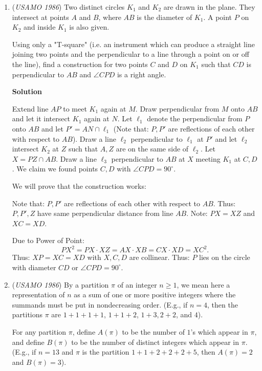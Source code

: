 \begin{enumerate}
 In summary, the smallest value of $n$ greater than 1 for which $I_n$ is an integer is $\boxed{337}$.

 


	\item (\textit{USAMO 1986}) Two distinct circles $K_1$ and $K_2$ are drawn in the plane. They intersect at points $A$ and $B$, where $AB$ is the diameter of $K_1$. A point $P$ on $K_2$ and inside $K_1$ is also given.


 Using only a "T-square" (i.e. an instrument which can produce a straight line joining two points and the perpendicular to a line through a point on or off the line), find a construction for two points $C$ and $D$ on $K_1$ such that $CD$ is perpendicular to $AB$ and $\angle CPD$ is a right angle.


 



\textbf{Solution}

Extend line $AP$ to meet $K_1$ again at $M$. Draw perpendicular from $M$ onto $AB$ and let it intersect $K_1$ again at $N$. Let $\ell_1$ denote the perpendicular from $P$ onto $AB$ and let $P'=AN \cap \ell_1$ (Note that: $P, P'$ are reflections of each other with respect to $AB$). Draw a line $\ell_2$ perpendicular to $\ell_1$ at $P'$ and let $\ell_2$ intersect $K_2$ at $Z$ such that $A, Z$ are on the same side of $\ell_2$. Let $X = PZ \cap AB$. Draw a line $\ell_3$ perpendicular to $AB$ at $X$ meeting $K_1$ at $C, D$. We claim we found points $C, D$ with $\angle CPD = 90^\circ$.

 We will prove that the construction works: 

 Note that: $P, P'$ are reflections of each other with respect to $AB$. Thus: $P, P', Z$ have same perpendicular distance from line $AB$. Note: $PX=XZ$ and $XC=XD$. 

 Due to Power of Point: 
 \[PX^2 = PX \cdot XZ = AX \cdot XB = CX \cdot XD = XC^2.\] Thus: $XP=XC=XD$ with $X, C, D$ are collinear. Thus: $P$ lies on the circle with diameter $CD$ or $\angle CPD = 90^\circ$.

 


	\item (\textit{USAMO 1986}) By a partition $\pi$ of an integer $n\ge 1$, we mean here a representation of $n$ as a sum of one or more positive integers where the summands must be put in nondecreasing order. (E.g., if $n=4$, then the partitions $\pi$ are $1+1+1+1$, $1+1+2$, $1+3, 2+2$, and $4$).


 For any partition $\pi$, define $A(\pi)$ to be the number of $1$'s which appear in $\pi$, and define $B(\pi)$ to be the number of distinct integers which appear in $\pi$. (E.g., if $n=13$ and $\pi$ is the partition $1+1+2+2+2+5$, then $A(\pi)=2$ and $B(\pi) = 3$).



\end{enumerate}
